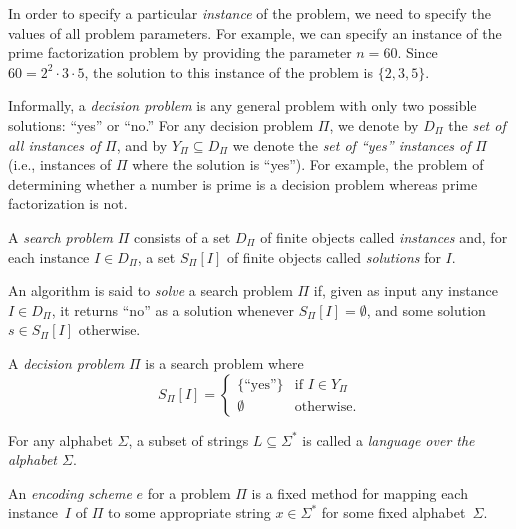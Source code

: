In order to specify a particular {\em instance\/} of the problem, we need to
specify the values of all problem parameters.  For example, we can specify an
instance of the prime factorization problem by providing the parameter $n=60$.  
Since $60=2^2\cdot 3\cdot 5$, the solution to this instance of the problem is 
$\{2,3,5\}$.

Informally, a {\em decision problem\/} is any general problem with only two
possible solutions: ``yes'' or ``no.''  For any decision problem $\Pi$, we
denote by $D_\Pi$ the {\em set of all instances of\/} $\Pi$, and by
$Y_\Pi\subseteq D_\Pi$ we denote the {\em set of ``yes'' instances of\/} $\Pi$
(i.e., instances of $\Pi$ where the solution is ``yes'').
For example, the problem of determining whether a number is prime is a
decision problem whereas prime factorization is not.

\begin{definition}
{\rm A {\em search problem\/} $\Pi$ consists of a set $D_\Pi$ of finite
objects called {\em instances\/} and, for each instance $I\in D_\Pi$, a set
$S_\Pi[I]$ of finite objects called {\em solutions\/} for $I$.}
\end{definition}

\begin{definition}
{\rm An algorithm is said to {\em solve\/} a search problem $\Pi$ if, given
as input any instance $I\in D_\Pi$, it returns ``no'' as a solution whenever
$S_\Pi[I]=\emptyset$, and some solution $s\in S_\Pi[I]$ otherwise.}
\end{definition}

\begin{definition}
{\rm A {\em decision problem\/} $\Pi$ is a search problem where
$$
  S_\Pi[I]=\left\{ \begin{array}{ll}
                     \{\mbox{``yes''}\} & \mbox{if $I\in Y_\Pi$} \\
                     \emptyset         & \mbox{otherwise.}
                   \end{array}
\right.
$$}
\end{definition}

\begin{definition}
{\rm For any alphabet $\Sigma$, a subset of strings $L\subseteq\Sigma^*$ is
called a {\em language over the alphabet $\Sigma$}.}
\end{definition}

\begin{definition}
{\rm An {\em encoding scheme\/} $e$ for a problem $\Pi$ is a fixed method for
mapping each instance~$I$ of $\Pi$ to some appropriate string $x\in\Sigma^*$
for some fixed alphabet~$\Sigma$.}
\end{definition}

